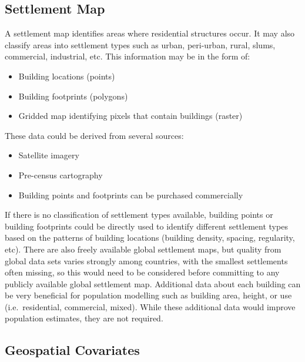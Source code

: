 \documentclass[]{book}
\providecommand{\tightlist}{%
  \setlength{\itemsep}{0pt}\setlength{\parskip}{0pt}}
\begin{document}
\subsection{Settlement Map}\label{settlement-map-1}

A settlement map identifies areas where residential structures occur. It
may also classify areas into settlement types such as urban, peri-urban,
rural, slums, commercial, industrial, etc. This information may be in
the form of:

\begin{itemize}
\tightlist
\item
  Building locations (points)\\
\item
  Building footprints (polygons)\\
\item
  Gridded map identifying pixels that contain buildings (raster)
\end{itemize}

These data could be derived from several sources:

\begin{itemize}
\tightlist
\item
  Satellite imagery\\
\item
  Pre-census cartography\\
\item
  Building points and footprints can be purchased commercially
\end{itemize}

If there is no classification of settlement types available, building
points or building footprints could be directly used to identify
different settlement types based on the patterns of building locations
(building density, spacing, regularity, etc). There are also freely
available global settlement maps, but quality from global data sets
varies strongly among countries, with the smallest settlements often
missing, so this would need to be considered before committing to any
publicly available global settlement map. Additional data about each
building can be very beneficial for population modelling such as
building area, height, or use (i.e.~residential, commercial, mixed).
While these additional data would improve population estimates, they are
not required.

\subsection{Geospatial Covariates}\label{geospatial-covariates-3}
\end{document}
